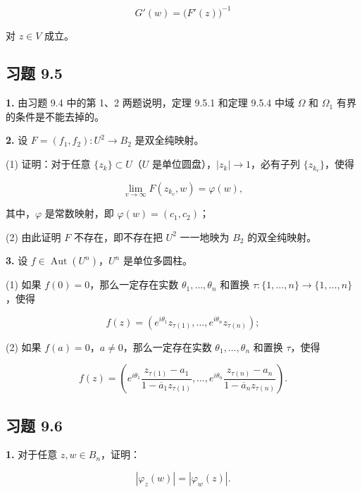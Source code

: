 \documentclass[11pt,a4paper]{article}
\begin{document}
\[
G'(w)=\bigl(F'(z)\bigr)^{-1}
\]

对 \(z\in V\) 成立。

\subsection{习题 9.5}\label{ch09-practice-heading-6}

\par{}
\noindent\textbf{1.} 由习题 9.4 中的第 1、2 两题说明，定理 9.5.1 和定理 9.5.4
中域 \(\Omega\) 和 \(\Omega_1\) 有界的条件是不能去掉的。

\par{}
\noindent\textbf{2.} 设 \(F=(f_1,f_2):U^2\to B_2\) 是双全纯映射。

(1) 证明：对于任意 \(\{z_k\}\subset U\)（\(U\)
是单位圆盘），\(|z_k|\to1\)，必有子列 \(\{z_{k_v}\}\)，使得

\[
\lim_{v\to\infty}F(z_{k_v},w)=\varphi(w),
\]

其中，\(\varphi\) 是常数映射，即 \(\varphi(w)=(c_1,c_2)\)；

(2) 由此证明 \(F\) 不存在，即不存在把 \(U^2\) 一一地映为 \(B_2\)
的双全纯映射。

\par{}
\noindent\textbf{3.} 设 \(f\in\operatorname{Aut}(U^n)\)，\(U^n\) 是单位多圆柱。

(1) 如果 \(f(0)=0\)，那么一定存在实数 \(\theta_1,\ldots,\theta_n\)
和置换 \(\tau:\{1,\ldots,n\}\to\{1,\ldots,n\}\)，使得

\[
f(z)=(e^{i\theta_1}z_{\tau(1)},\ldots,e^{i\theta_n}z_{\tau(n)});
\]

(2) 如果 \(f(a)=0\)，\(a\ne0\)，那么一定存在实数
\(\theta_1,\ldots,\theta_n\) 和置换 \(\tau\)，使得

\[
f(z)=\left(
e^{i\theta_1}\frac{z_{\tau(1)}-a_1}{1-\overline a_1z_{\tau(1)}},\ldots,
e^{i\theta_n}\frac{z_{\tau(n)}-a_n}{1-\overline a_nz_{\tau(n)}}
\right).
\]

\subsection{习题 9.6}\label{ch09-practice-heading-7}

\par{}
\noindent\textbf{1.} 对于任意 \(z,w\in B_n\)，证明：

\[
|\varphi_z(w)|=|\varphi_w(z)|.
\]
\end{document}
